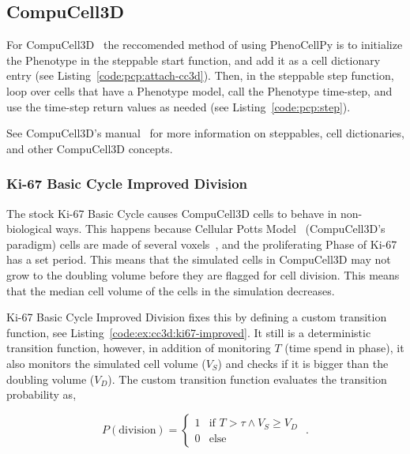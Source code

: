\subsection{CompuCell3D}\label{sec:examples:cc3d}
For CompuCell3D~\cite{swat_multi-scale_2012} the reccomended method of using PhenoCellPy is to initialize the Phenotype in the steppable start function, and add it as a cell dictionary entry (see Listing~\ref{code:pcp:attach-cc3d}). Then, in the steppable step function, loop over cells that have a Phenotype model, call the Phenotype time-step, and use the time-step return values as needed (see Listing~\ref{code:pcp:step}).

See CompuCell3D's manual~\cite{cc3d_python_scripting_manual} for more information on steppables, cell dictionaries, and other CompuCell3D concepts.


\subsubsection{Ki-67 Basic Cycle Improved Division}\label{sec:examples:cc3d:ki67-improved}

The stock Ki-67 Basic Cycle causes CompuCell3D cells to behave in non-biological ways. This happens because Cellular Potts Model~\cite{graner1992simulation} (CompuCell3D's paradigm) cells are made of several voxels~\cite{swat_multi-scale_2012}, and the proliferating Phase of Ki-67 has a set period. This means that the simulated cells in CompuCell3D may not grow to the doubling volume before they are flagged for cell division. This means that the median cell volume of the cells in the simulation decreases.

Ki-67 Basic Cycle Improved Division fixes this by defining a custom transition function, see Listing~\ref{code:ex:cc3d:ki67-improved}. It still is a deterministic transition function, however, in addition of monitoring $T$ (time spend in phase), it also monitors the simulated cell volume ($V_S$) and checks if it is bigger than the doubling volume ($V_D$). The custom transition function evaluates the transition probability as,

\begin{equation}\label{eq:ki67:transition}
    P(\text{division}) = \begin{cases} 1 & \text{if }T > \tau \wedge V_S \geq V_D\\
    0 & \text{else}
    \end{cases}\,\,.
\end{equation}

